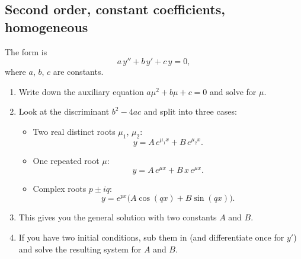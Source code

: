 \documentclass{article}
\begin{document}
\subsection{Second order, constant coefficients, homogeneous}
The form is
\[
a\,y'' + b\,y' + c\,y = 0,
\]
where $a$, $b$, $c$ are constants.
\begin{enumerate}
    \item Write down the auxiliary equation $a\mu^2 + b\mu + c = 0$ and solve for $\mu$.
    \item Look at the discriminant $b^2 - 4ac$ and split into three cases:
    \begin{itemize}
        \item Two real distinct roots $\mu_1$, $\mu_2$:
        \[
            y = A\,e^{\mu_1 x} + B\,e^{\mu_2 x}.
        \]
        \item One repeated root $\mu$:
        \[
            y = A\,e^{\mu x} + B\,x\,e^{\mu x}.
        \]
        \item Complex roots $p \pm iq$:
        \[
            y = e^{px}\big(A\cos(qx) + B\sin(qx)\big).
        \]
    \end{itemize}
    \item This gives you the general solution with two constants $A$ and $B$.
    \item If you have two initial conditions, sub them in (and differentiate once for $y'$) and solve the resulting system for $A$ and $B$.
\end{enumerate}
\end{document}
